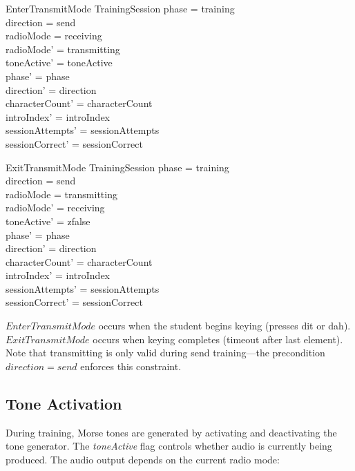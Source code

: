 \documentclass[a4paper,10pt,fleqn]{article}
\begin{document}
\begin{schema}{EnterTransmitMode}
\Delta TrainingSession
\where
phase = training \\
direction = send \\
radioMode = receiving \\
radioMode' = transmitting \\
toneActive' = toneActive \\
phase' = phase \\
direction' = direction \\
characterCount' = characterCount \\
introIndex' = introIndex \\
sessionAttempts' = sessionAttempts \\
sessionCorrect' = sessionCorrect
\end{schema}

\begin{schema}{ExitTransmitMode}
\Delta TrainingSession
\where
phase = training \\
direction = send \\
radioMode = transmitting \\
radioMode' = receiving \\
toneActive' = zfalse \\
phase' = phase \\
direction' = direction \\
characterCount' = characterCount \\
introIndex' = introIndex \\
sessionAttempts' = sessionAttempts \\
sessionCorrect' = sessionCorrect
\end{schema}

$EnterTransmitMode$ occurs when the student begins keying (presses dit or dah).
$ExitTransmitMode$ occurs when keying completes (timeout after last element).
Note that transmitting is only valid during send training---the precondition
$direction = send$ enforces this constraint.

\subsection{Tone Activation}

During training, Morse tones are generated by activating and deactivating the
tone generator. The \emph{toneActive} flag controls whether audio is currently
being produced. The audio output depends on the current radio mode:
\end{document}
